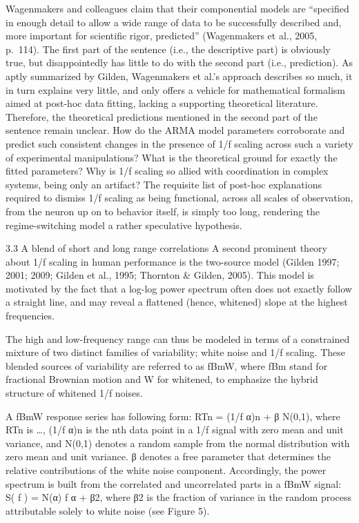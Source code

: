 \documentclass[12pt,]{book}
\begin{document}
Wagenmakers and colleagues claim that their componential models are ``specified in enough detail to allow a wide range of data to be successfully described and, more important for scientific rigor, predicted'' (Wagenmakers et al., 2005, p.~114). The first part of the sentence (i.e., the descriptive part) is obviously true, but disappointedly has little to do with the second part (i.e., prediction). As aptly summarized by Gilden, Wagenmakers et al.'s approach describes so much, it in turn explains very little, and only offers a vehicle for mathematical formalism aimed at post-hoc data fitting, lacking a supporting theoretical literature. Therefore, the theoretical predictions mentioned in the second part of the sentence remain unclear. How do the ARMA model parameters corroborate and predict such consistent changes in the presence of 1/f scaling across such a variety of experimental manipulations? What is the theoretical ground for exactly the fitted parameters? Why is 1/f scaling so allied with coordination in complex systems, being only an artifact? The requisite list of post-hoc explanations required to dismiss 1/f scaling as being functional, across all scales of observation, from the neuron up on to behavior itself, is simply too long, rendering the regime-switching model a rather speculative hypothesis.

3.3 A blend of short and long range correlations
A second prominent theory about 1/f scaling in human performance is the two-source model (Gilden 1997; 2001; 2009; Gilden et al., 1995; Thornton \& Gilden, 2005). This model is motivated by the fact that a log-log power spectrum often does not exactly follow a straight line, and may reveal a flattened (hence, whitened) slope at the highest frequencies.

The high and low-frequency range can thus be modeled in terms of a constrained mixture of two distinct families of variability; white noise and 1/f scaling. These blended sources of variability are referred to as fBmW, where fBm stand for fractional Brownian motion and W for whitened, to emphasize the hybrid structure of whitened 1/f noises.

A fBmW response series has following form: RTn = (1/f α)n + β N(0,1), where RTn is \ldots{}, (1/f α)n is the nth data point in a 1/f signal with zero mean and unit variance, and N(0,1) denotes a random sample from the normal distribution with zero mean and unit variance. β denotes a free parameter that determines the relative contributions of the white noise component. Accordingly, the power spectrum is built from the correlated and uncorrelated parts in a fBmW signal: S( f ) = N(α) f α + β2, where β2 is the fraction of variance in the random process attributable solely to white noise (see Figure 5).
\end{document}
